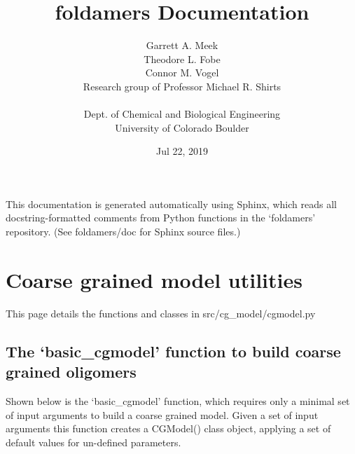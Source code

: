 \documentclass[letterpaper,12pt,english,openany,oneside]{sphinxmanual}
\title{foldamers Documentation}
\date{Jul 22, 2019}
\author{Garrett A. Meek\\Theodore L. Fobe\\Connor M. Vogel\\Research group of Professor Michael R. Shirts\\ \\Dept. of Chemical and Biological Engineering\\University of Colorado Boulder}
\begin{document}
\pagestyle{empty}
\maketitle
\pagestyle{plain}
\sphinxtableofcontents
\pagestyle{normal}
\label{\detokenize{index::doc}}


This documentation is generated automatically using Sphinx, which reads all docstring-formatted comments from Python functions in the ‘foldamers’ repository.  (See foldamers/doc for Sphinx source files.)


\chapter{Coarse grained model utilities}
\label{\detokenize{cg_model:coarse-grained-model-utilities}}\label{\detokenize{cg_model::doc}}
This page details the functions and classes in src/cg\_model/cgmodel.py


\section{The ‘basic\_cgmodel’ function to build coarse grained oligomers}
\label{\detokenize{cg_model:the-basic-cgmodel-function-to-build-coarse-grained-oligomers}}
Shown below is the ‘basic\_cgmodel’ function, which requires only a minimal set of input arguments to build a coarse grained model.  Given a set of input arguments this function creates a CGModel() class object, applying a set of default values for un-defined parameters.

\label{\detokenize{cg_model:module-cg_model.cgmodel}}
\end{document}
